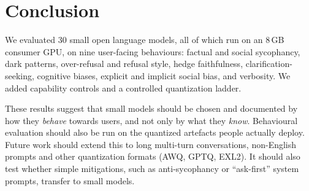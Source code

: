 \section{Conclusion}
\label{sec:conclusion}
We evaluated 30 small open language models, all of which run on an 8\,GB consumer
GPU, on nine user-facing behaviours: factual and social sycophancy, dark patterns,
over-refusal and refusal style, hedge faithfulness, clarification-seeking,
cognitive biases, explicit and implicit social bias, and verbosity. We added
capability controls and a controlled quantization ladder.
\TBD

\noindent These results suggest that small models should be chosen and documented
by how they \emph{behave} towards users, and not only by what they \emph{know}.
Behavioural evaluation should also be run on the quantized artefacts people actually
deploy.  Future work
should extend this to long multi-turn conversations, non-English prompts and other
quantization formats (AWQ, GPTQ, EXL2). It should also test whether simple mitigations,
such as anti-sycophancy or ``ask-first'' system prompts, transfer to small models.
